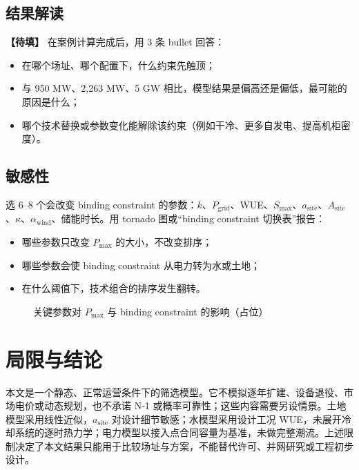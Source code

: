 \documentclass{mcmthesis}
\begin{document}
\subsection{结果解读}

\noindent\textbf{【待填】} 在案例计算完成后，用 3 条 bullet 回答：
\begin{itemize}
\item 在哪个场址、哪个配置下，什么约束先触顶；
\item 与 950 MW、2,263 MW、5 GW 相比，模型结果是偏高还是偏低，最可能的原因是什么；
\item 哪个技术替换或参数变化能解除该约束（例如干冷、更多自发电、提高机柜密度）。
\end{itemize}

\subsection{敏感性}

选 6--8 个会改变 binding constraint 的参数：\(k\)、\(P_{\mathrm{grid}}\)、WUE、\(S_{\max}\)、\(a_{\mathrm{site}}\)、\(A_{\mathrm{site}}\)、\(\kappa\)、\(\alpha_{\mathrm{wind}}\)、储能时长。用 tornado 图或“binding constraint 切换表”报告：
\begin{itemize}
\item 哪些参数只改变 \(P_{\max}\) 的大小，不改变排序；
\item 哪些参数会使 binding constraint 从电力转为水或土地；
\item 在什么阈值下，技术组合的排序发生翻转。
\end{itemize}

\begin{figure}[H]
\centering
{}
\caption{关键参数对 \(P_{\max}\) 与 binding constraint 的影响（占位）}
\label{fig:sensitivity}
\end{figure}

\section{局限与结论}
\label{sec:limits}

本文是一个静态、正常运营条件下的筛选模型。它不模拟逐年扩建、设备退役、市场电价或动态规划，也不承诺 N-1 或概率可靠性；这些内容需要另设情景。土地模型采用线性近似，\(a_{\mathrm{site}}\) 对设计细节敏感；水模型采用设计工况 WUE，未展开冷却系统的逐时热力学；电力模型以接入点合同容量为基准，未做完整潮流。上述限制决定了本文结果只能用于比较场址与方案，不能替代许可、并网研究或工程初步设计。
\end{document}

